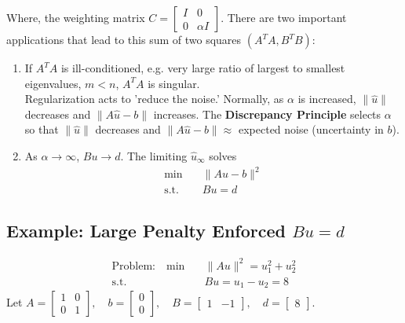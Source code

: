 \documentclass[]{article}
\begin{document}
Where, the weighting matrix $C =  \begin{bmatrix}
I & 0 \\ 0 & \alpha I 
\end{bmatrix}$. There are two important applications that lead to this sum of two squares $(A^T A, B^{T}B)$:
\begin{enumerate}
	\item If $A^{T}A$ is ill-conditioned, e.g. very large ratio of largest to smallest eigenvalues, $m < n$, $A^{T}A$ is singular. \\
	Regularization acts to 'reduce the noise.' Normally, as $\alpha$ is increased, $\parallel \hat{u} \parallel$ decreases and $\parallel A\hat{u} - b \parallel$ increases. The \textbf{Discrepancy Principle} selects $\alpha$ so that $\parallel \hat{u} \parallel$ decreases and $\parallel A\hat{u} - b \parallel \approx $ expected noise (uncertainty in $b$).
	\item As $\alpha \rightarrow \infty$, $Bu \rightarrow d$. The limiting $\hat{u}_{\infty}$ solves 
	\begin{align}
	\min &\quad \parallel Au-b \parallel^2 \\
	\textrm{s.t.} &\quad Bu=d \nonumber 
	\end{align}
\end{enumerate}

\subsection{Example: Large Penalty Enforced $Bu=d$}
\begin{align*}
\textrm{Problem:} \quad \min &\quad \parallel Au \parallel^2 = u_{1}^{2}+u_{2}^{2} \\
\textrm{s.t.} &\quad Bu = u_1 - u_2 = 8
\end{align*}
Let $A = \begin{bmatrix}
1 & 0 \\ 0 & 1
\end{bmatrix}, \quad b = \begin{bmatrix}
0 \\ 0
\end{bmatrix}, \quad B = \begin{bmatrix}
1 & -1
\end{bmatrix}, \quad d = \begin{bmatrix}
8
\end{bmatrix}$.
\end{document}
